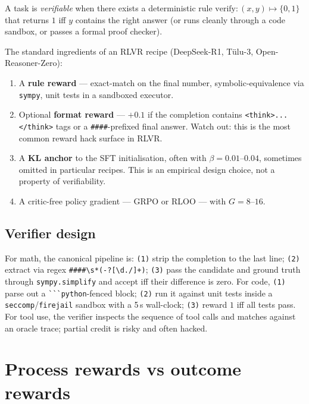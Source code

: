 \documentclass[11pt,oneside]{scrbook}
\begin{document}
\begin{definition}
A task is \emph{verifiable} when there exists a deterministic rule
$\text{verify}\colon (x, y) \mapsto \{0, 1\}$ that returns $1$ iff $y$
contains the right answer (or runs cleanly through a code sandbox, or
passes a formal proof checker).
\end{definition}

The standard ingredients of an RLVR recipe (DeepSeek-R1, Tülu-3,
Open-Reasoner-Zero):

\begin{enumerate}\setlength{\itemsep}{2pt}
  \item A \textbf{rule reward} --- exact-match on the final number,
        symbolic-equivalence via \texttt{sympy}, unit tests in a sandboxed
        executor.
  \item Optional \textbf{format reward} --- $+0.1$ if the completion
        contains \verb|<think>...</think>| tags or a \verb|####|-prefixed
        final answer. Watch out: this is the most common reward hack
        surface in RLVR.
  \item A \textbf{KL anchor} to the SFT initialisation, often with
        $\beta = 0.01$--$0.04$, sometimes omitted in particular recipes. This is an empirical design choice, not a property of verifiability.
  \item A critic-free policy gradient --- GRPO or RLOO --- with $G = 8$--$16$.
\end{enumerate}

\subsection*{Verifier design}

For math, the canonical pipeline is: \texttt{(1)} strip the completion to
the last line; \texttt{(2)} extract via regex \verb|####\s*(-?[\d./]+)|;
\texttt{(3)} pass the candidate and ground truth through \texttt{sympy.simplify}
and accept iff their difference is zero. For code, \texttt{(1)} parse out a
\verb|```python|-fenced block; \texttt{(2)} run it against unit tests inside
a \texttt{seccomp}/\texttt{firejail} sandbox with a 5\,s wall-clock; \texttt{(3)}
reward $1$ iff all tests pass. For tool use, the verifier inspects the
sequence of tool calls and matches against an oracle trace; partial credit
is risky and often hacked.

\section{Process rewards vs outcome rewards}
\end{document}
